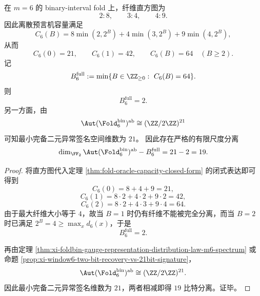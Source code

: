 \begin{proposition}\label{prop:conclusion-window6-19bit-separation}
在 \(m=6\) 的 binary-interval fold 上，纤维直方图为
\[
2:8,\qquad 3:4,\qquad 4:9.
\]
因此离散预言机容量满足
\[
C_6(B)=8\min(2,2^B)+4\min(3,2^B)+9\min(4,2^B),
\]
从而
\[
C_6(0)=21,\qquad C_6(1)=42,\qquad C_6(B)=64\quad(B\ge 2).
\]
记
\[
B^{\mathrm{full}}_6:=\min\{B\in\ZZ_{\ge 0}:\ C_6(B)=64\}.
\]
则
\[
B^{\mathrm{full}}_6=2.
\]
另一方面，由
\[
\Aut(\Fold_6^{\mathrm{bin}})^{\mathrm{ab}}\cong (\ZZ/2\ZZ)^{21}
\]
可知最小完备二元异常签名空间维数为 \(21\)。
因此存在严格的有限尺度分离
\[
\dim_{\FF_2}\Aut(\Fold_6^{\mathrm{bin}})^{\mathrm{ab}}-B^{\mathrm{full}}_6
=
21-2
=
19.
\]
\end{proposition}
\begin{proof}
将直方图代入定理 \ref{thm:fold-oracle-capacity-closed-form} 的闭式表达即可得到
\[
C_6(0)=8+4+9=21,
\]
\[
C_6(1)=8\cdot 2+4\cdot 2+9\cdot 2=42,
\]
\[
C_6(2)=8\cdot 2+4\cdot 3+9\cdot 4=64.
\]
由于最大纤维大小等于 \(4\)，故当 \(B=1\) 时仍有纤维不能被完全分离，而当 \(B=2\) 时已满足 \(2^B=4\ge \max_x d_6(x)\)，于是
\[
B^{\mathrm{full}}_6=2.
\]

再由定理 \ref{thm:xi-foldbin-gauge-representation-distribution-law-m6-spectrum} 或命题 \ref{prop:xi-window6-two-bit-recovery-vs-21bit-signature}，
\[
\Aut(\Fold_6^{\mathrm{bin}})^{\mathrm{ab}}\cong (\ZZ/2\ZZ)^{21}.
\]
因此最小完备二元异常签名维数为 \(21\)，两者相减即得 \(19\) 比特分离。证毕。
\end{proof}







\endinput
